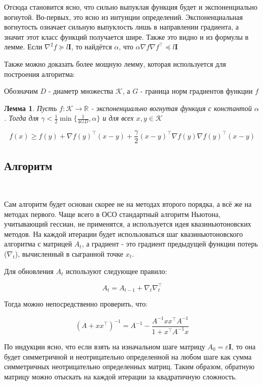 \documentclass[12pt]{article}
\newtheorem*{lemma}{Лемма}
\theoremstyle{definition}
\begin{document}
Отсюда становится ясно, что сильно выпуклая функция будет и экспоненциально вогнутой. Во-первых, это ясно из интуиции определений. Экспоненциальная вогнутость означает сильную выпуклость лишь в направлении градиента, а значит этот класс функций получается шире. Также это видно и из формулы в лемме. Если $\nabla^2 f \succcurlyeq l\mathbf{I}$, то найдётся $\alpha$, что $\alpha \nabla f \nabla f^\top \preccurlyeq l\mathbf{I}$

Также можно доказать более мощную лемму, которая используется для построения алгоритма:

Обозначим $D$ - диаметр множества $\mathcal{K}$, а $G$ - граница норм градиентов функции $f$

\begin{lemma}
Пусть $f: \mathcal{K} \rightarrow \mathbb{R}$ - экспоненциально вогнутая функция с константой $\alpha$. Тогда для $\gamma < \frac{1}{2} \min\{\frac{1}{4GD}, \alpha\}$ и для всех $x, y \in \mathcal{K}$

$$ f(x) \geqslant f(y) + \nabla f(y)^\top (x - y) + \frac{\gamma}{2} (x - y)^\top \nabla f(y) \nabla f(y)^\top (x - y) $$
\end{lemma}

\subsection{Алгоритм}
$ $

Сам алгоритм будет основан скорее не на методах второго порядка, а всё же на методах первого. Чаще всего в ОСО стандартный алгоритм Ньютона, учитывающий гессиан, не применятся, а используется идея квазиньютоновских методов. На каждой итерации будет использоваться шаг квазиньютоновского алгоритма с матрицей $A_t$, а градиент - это градиент предыдущей функции потерь ($\nabla_t$), вычисленный в сыгранной точке $x_t$.

Для обновления $A_t$ используют следующее правило:

$$ A_t = A_{t - 1} + \nabla_t \nabla_t^\top $$

Тогда можно непосредственно проверить, что:

$$ (A + xx^\top)^{-1} = A^{-1} - \frac{A^{-1}xx^\top A^{-1}}{1 + x^\top A^{-1} x} $$

По индукции ясно, что если взять на изначальном шаге матрицу $A_0 = \varepsilon \mathbf{I}$, то она будет симметричной и неотрицательно определенной на любом шаге как сумма симметричных неотрицательно определенных матриц. Таким образом, обратную матрицу можно отыскать на каждой итерации за квадратичную сложность.
\end{document}
